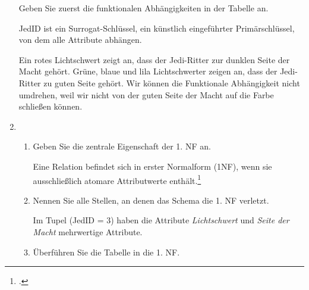 \documentclass{bschlangaul-aufgabe}
\begin{document}
\begin{enumerate}
Geben Sie zuerst die funktionalen Abhängigkeiten in der Tabelle an.

\begin{liAntwort}

JedID ist ein Surrogat-Schlüssel, \dh ein künstlich eingeführter
Primärschlüssel, von dem alle Attribute abhängen.

Ein rotes Lichtschwert zeigt an, dass der Jedi-Ritter zur dunklen Seite
der Macht gehört. Grüne, blaue und lila Lichtschwerter zeigen an, dass
der Jedi-Ritter zu guten Seite gehört. Wir können die Funktionale
Abhängigkeit nicht umdrehen, weil wir nicht von der guten Seite der
Macht auf die Farbe schließen können.
\end{liAntwort}


\item \strut

\begin{enumerate}


\item Geben Sie die zentrale Eigenschaft der 1. NF an.

\begin{liAntwort}
Eine Relation befindet sich in erster Normalform (1NF), wenn sie
ausschließlich atomare Attributwerte enthält.\footcite[Seite 448]{schneider}
\end{liAntwort}


\item Nennen Sie alle Stellen, an denen das Schema die 1. NF verletzt.

\begin{liAntwort}
Im Tupel (JedID = 3) haben die Attribute \emph{Lichtschwert} und
\emph{Seite der Macht} mehrwertige Attribute.
\end{liAntwort}


\item Überführen Sie die Tabelle in die 1. NF.


\end{enumerate}
\end{enumerate}
\end{document}

